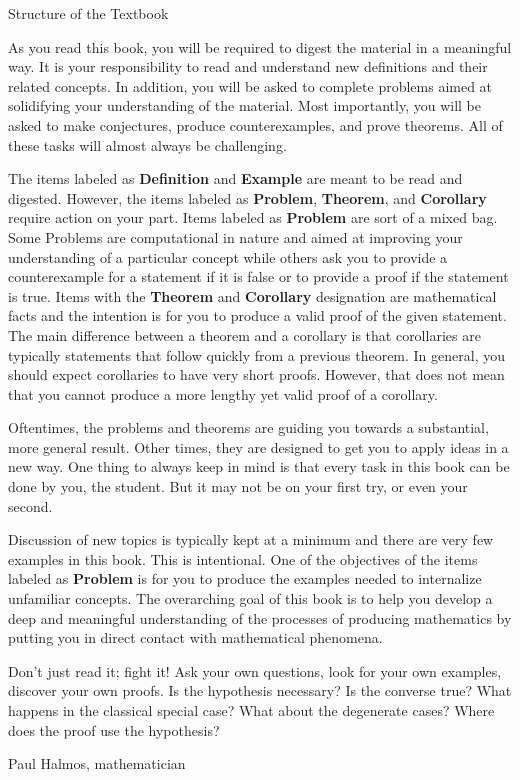 \begin{section}{Structure of the Textbook}

As you read this book, you will be required to digest the material in a meaningful way.  It is your responsibility to read and understand new definitions and their related concepts.  In addition, you will be asked to complete problems aimed at solidifying your understanding of the material.  Most importantly, you will be asked to make conjectures, produce counterexamples, and prove theorems. All of these tasks will almost always be challenging.

The items labeled as \textbf{Definition} and \textbf{Example} are meant to be read and digested.  However, the items labeled as \textbf{Problem}, \textbf{Theorem}, and \textbf{Corollary} require action on your part.  Items labeled as \textbf{Problem} are sort of a mixed bag. Some Problems are computational in nature and aimed at improving your understanding of a particular concept while others ask you to provide a counterexample for a statement if it is false or to provide a proof if the statement is true. Items with the \textbf{Theorem} and \textbf{Corollary} designation are mathematical facts and the intention is for you to produce a valid proof of the given statement. The main difference between a theorem and a corollary is that corollaries are typically statements that follow quickly from a previous theorem.  In general, you should expect corollaries to have very short proofs.  However, that does not mean that you cannot produce a more lengthy yet valid proof of a corollary.

Oftentimes, the problems and theorems are guiding you towards a substantial, more  general result. Other times, they are designed to get you to apply ideas in a new way. One thing to always keep in mind is that every task in this book can be done by you, the student. But it may not be on your first try, or even your second.

Discussion of new topics is typically kept at a minimum and there are very few examples in this book. This is intentional.  One of the objectives of the items labeled as \textbf{Problem} is for you to produce the examples needed to internalize unfamiliar concepts.  The overarching goal of this book is to help you develop a deep and meaningful understanding of the processes of producing mathematics by putting you in direct contact with mathematical phenomena.

\epigraph{Don't just read it; fight it! Ask your own questions, look for your own examples, discover your own proofs. Is the hypothesis necessary? Is the converse true? What happens in the classical special case? What about the degenerate cases? Where does the proof use the hypothesis?}{Paul Halmos, mathematician}

\end{section}

